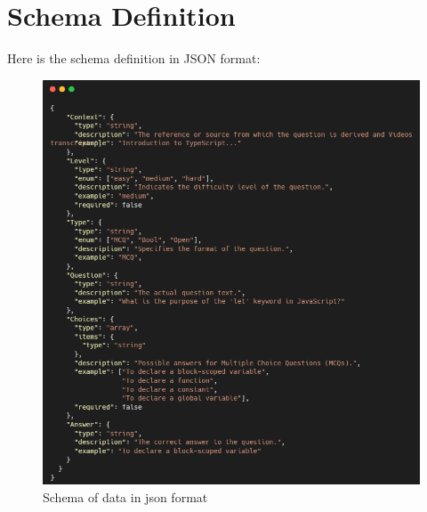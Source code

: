 \newpage
\section*{Schema Definition}

Here is the schema definition in JSON format:

\begin{figure}[h!]
	\centering
	\includegraphics[scale=0.85]{figures/schema definition in JSON format.png}
	\caption{ Schema of data in json format }
\end{figure}


